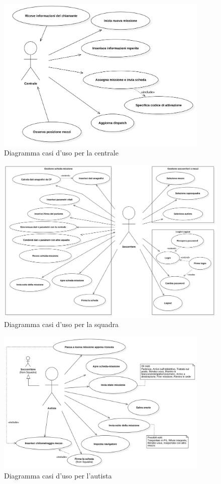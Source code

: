 \documentclass{article}
\begin{document}
    \begin{figure}
        \centering
        \includegraphics[width=4in]{diagrams/png/uc-centrale.png}
        \caption{Diagramma casi d'uso per la centrale}
        \label{fig:uc-controlcenter}
    \end{figure}
    \begin{figure}
        \centering
        \includegraphics[width=5in]{diagrams/png/uc-soccorritore.png}
        \caption{Diagramma casi d'uso per la squadra}
        \label{fig:uc-rescueteam}
    \end{figure}
    \begin{figure}
        \centering
        \includegraphics[width=4in]{diagrams/png/uc-autista.png}
        \caption{Diagramma casi d'uso per l'autista}
        \label{fig:uc-autista}
    \end{figure}
\end{document}
